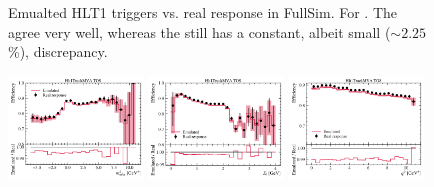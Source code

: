 \begin{figure}[ht]
    \caption{
        Emualted HLT1 triggers vs. real response in FullSim. For \Bp.
        The  agree very well,
        whereas the  still has a constant,
        albeit small ($\sim\!2.25$\%), discrepancy.
    }
    \label{fig:hlt1-trackmva-emu}
\end{figure}

\begin{figure}[ht]
    \centering
    \includegraphics[width=0.32\textwidth]{
        ./figs-mc-emulation/emulate-hlt1/b0_Hlt1TrackMVA_TOS_mmiss2.pdf
    }
    \includegraphics[width=0.32\textwidth]{
        ./figs-mc-emulation/emulate-hlt1/b0_Hlt1TrackMVA_TOS_el.pdf
    }
    \includegraphics[width=0.32\textwidth]{
        ./figs-mc-emulation/emulate-hlt1/b0_Hlt1TrackMVA_TOS_q2.pdf
    }


\end{figure}
